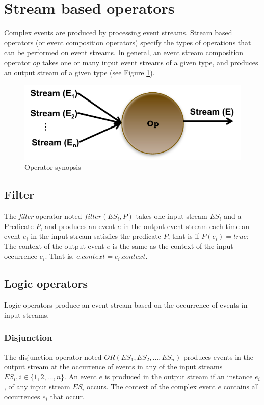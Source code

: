  \section{Stream based operators}
 \label{ch3:sec2.3.3}
 Complex events are produced by processing event streams. Stream based operators (or event composition operators) specify the types of operations that can be performed on event streams. In general, an event stream composition operator $op$ takes one or many input event streams of a given type, and produces an output stream of a given type (see Figure \ref{fig:op}).
 \begin{figure}[H]
  \begin{center}
    \includegraphics[scale=0.65]{chap3/images/op.pdf}
  \end{center}
  \caption{Operator synopsis}
  \label{fig:op}
\end{figure}

  \subsection{Filter}
  The \textit{filter} operator noted $filter (ES_i, P)$ takes one input stream $ES_i$ and a Predicate $P$, and produces an event $e$ in the output event stream each time an event $e_i$ in the input stream satisfies the predicate $P$, that is if $P(e_i)= true$; The context of the output event $e$ is the same as the context of the input occurrence $e_i$.
  That is, $e.context = e_i.context$.
 \subsection{Logic operators}
 Logic operators produce an event stream based on the occurrence of events in input streams.
 
 \subsubsection{Disjunction}
 The disjunction operator noted $OR(ES_1, ES_2, …, ES_n)$ produces events in the output stream at the occurrence of events in any of the input streams $ES_i, i \in \{1, 2, …,n\}$. An event $e$ is produced in the output stream if an instance $e_i$, of any input stream $ES_i$ occurs. The context of the complex event $e$ contains all occurrences $e_i$ that occur.
 
